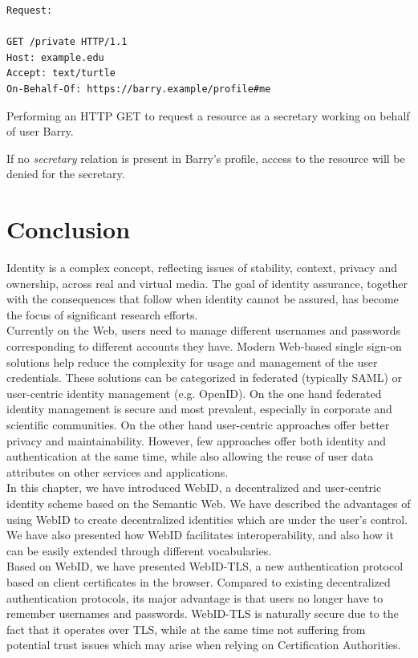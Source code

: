 \begin{example}
\begin{verbatim}
Request:

GET /private HTTP/1.1
Host: example.edu
Accept: text/turtle
On-Behalf-Of: https://barry.example/profile#me
\end{verbatim}
\caption{Performing an HTTP GET to request a resource as a secretary working on behalf of user Barry.}
\label{ex:secretary_request}
\end{example}

If no \textit{secretary} relation is present in Barry's profile, access to the resource will be denied for the secretary.

\section{Conclusion}
\label{sec:id-conclusion}
Identity is a complex concept, reflecting issues of stability, context, privacy and ownership, across real and virtual media. The goal of identity assurance, together with the consequences that follow when identity cannot be assured, has become the focus of significant research efforts.\\

Currently on the Web, users need to manage different usernames and passwords corresponding to different accounts they have. Modern Web-based single sign-on solutions help reduce the complexity for usage and management of the user credentials. These solutions can be categorized in federated (typically SAML) or user-centric identity management (e.g. OpenID). On the one hand federated identity management is secure and most prevalent, especially in corporate and scientific communities. On the other hand user-centric approaches offer better privacy and maintainability. However, few approaches offer both identity and authentication at the same time, while also allowing the reuse of user data attributes on other services and applications.\\

In this chapter, we have introduced WebID, a decentralized and user-centric identity scheme based on the Semantic Web. We have described the advantages of using WebID to create decentralized identities which are under the user's control. We have also presented how WebID facilitates interoperability, and also how it can be easily extended through different vocabularies.\\

Based on WebID, we have presented WebID-TLS, a new authentication protocol based on client certificates in the browser. Compared to existing decentralized authentication protocols, its major advantage is that users no longer have to remember usernames and passwords. WebID-TLS is naturally secure due to the fact that it operates over TLS, while at the same time not suffering from potential trust issues which may arise when relying on Certification Authorities.\\

